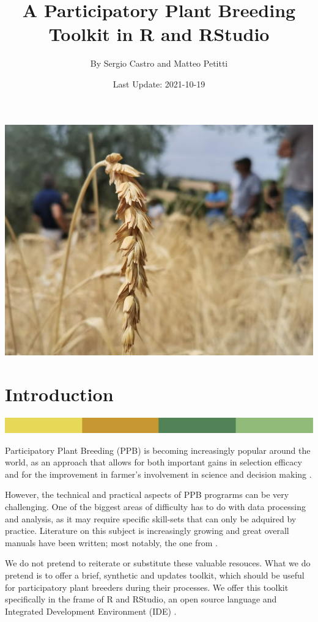 \documentclass[
]{book}
\title{A Participatory Plant Breeding Toolkit in R and RStudio}
\author{By Sergio Castro and Matteo Petitti}
\date{Last Update: 2021-10-19}
\begin{document}
\maketitle

{
\setcounter{tocdepth}{1}
\tableofcontents
}
\includegraphics{Cover.jpg}

\hypertarget{introduction}{%
\chapter{Introduction}\label{introduction}}

\includegraphics{rsrstrip.png}

Participatory Plant Breeding (PPB) is becoming increasingly popular around the world, as an approach that allows for both important gains in selection efficacy and for the improvement in farmer's involvement in science and decision making \citep{Ceccareli2020}.

However, the technical and practical aspects of PPB prograrms can be very challenging. One of the biggest areas of difficulty has to do with data processing and analysis, as it may require specific skill-sets that can only be adquired by practice. Literature on this subject is increasingly growing and great overall manuals have been written; most notably, the one from \citet{Tech-Manual}.

We do not pretend to reiterate or substitute these valuable resouces. What we do pretend is to offer a brief, synthetic and updates toolkit, which should be useful for participatory plant breeders during their processes. We offer this toolkit specifically in the frame of R and RStudio, an open source language and Integrated Development Environment (IDE) \citep{Rstudio}.
\end{document}
